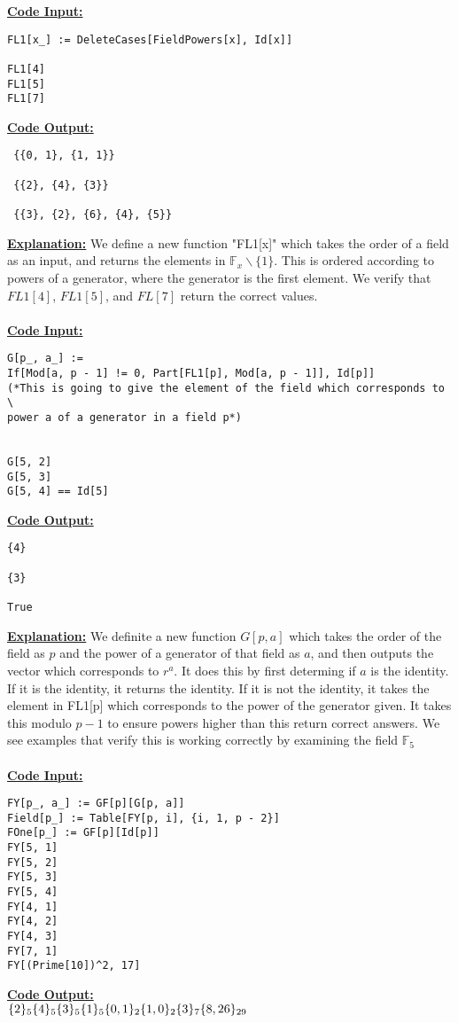 \documentclass[11pt]{article}
\theoremstyle{plain}
\theoremstyle{definition}
\begin{document}
 \textbf{\underline{Code Input:}}
 \begin{verbatim}
FL1[x_] := DeleteCases[FieldPowers[x], Id[x]]

FL1[4]
FL1[5]
FL1[7]
 \end{verbatim}
 \textbf{\underline{Code Output:}}
 \begin{verbatim}
 {{0, 1}, {1, 1}}
 
 {{2}, {4}, {3}}
 
 {{3}, {2}, {6}, {4}, {5}}
 \end{verbatim}
 \textbf{\underline{Explanation:}} We define a new function "FL1[x]" which takes the order of a field as an input, and returns the elements in $\mathbb{F}_x \backslash \{1\}$. This is ordered according to powers of a generator, where the generator is the first element. We verify that $FL1[4]$, $FL1[5]$, and $FL[7]$ return the correct values.\\
 \\
 \textbf{\underline{Code Input:}}
 \begin{verbatim}
G[p_, a_] := 
If[Mod[a, p - 1] != 0, Part[FL1[p], Mod[a, p - 1]], Id[p]]
(*This is going to give the element of the field which corresponds to \
power a of a generator in a field p*)


G[5, 2]
G[5, 3]
G[5, 4] == Id[5]
 \end{verbatim}
 \textbf{\underline{Code Output:}}
 \begin{verbatim}
{4}

{3}

True
 \end{verbatim}
 \textbf{\underline{Explanation:}} We definite a new function $G[p,a]$ which takes the order of the field as $p$ and the power of a generator of that field as $a$, and then outputs the vector which corresponds to $r^a$. It does this by first determing if $a$ is the identity. If it is the identity, it returns the identity. If it is not the identity, it takes the element in FL1[p] which corresponds to the power of the generator given. It takes this modulo $p-1$ to ensure powers higher than this return correct answers. We see examples that verify this is working correctly by examining the field $\mathbb{F}_5$ \\
 \\
\textbf{\underline{Code Input:}}
\begin{verbatim}
FY[p_, a_] := GF[p][G[p, a]]
Field[p_] := Table[FY[p, i], {i, 1, p - 2}]
FOne[p_] := GF[p][Id[p]]
FY[5, 1]
FY[5, 2]
FY[5, 3]
FY[5, 4]
FY[4, 1]
FY[4, 2]
FY[4, 3]
FY[7, 1]
FY[(Prime[10])^2, 17]
\end{verbatim}
\textbf{\underline{Code Output:}}\\
$
\{2\}_5\\
\{4\}_5\\
\{3\}_5\\
\{1\}_5\\
\{0,1\}_2\\
\{1,0\}_2\\
\{3\}_7\\
\{8,26\}_{29}\\
$
\end{document}
